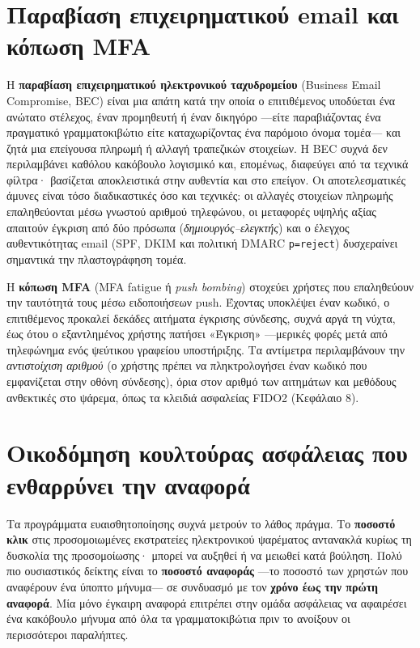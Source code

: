 \documentclass[11pt,openany]{book}
\begin{document}
\section{Παραβίαση επιχειρηματικού email και κόπωση MFA}\label{sec:5.5}
Η \textbf{παραβίαση επιχειρηματικού ηλεκτρονικού ταχυδρομείου} (Business Email Compromise, BEC) είναι μια απάτη κατά την οποία ο επιτιθέμενος υποδύεται ένα ανώτατο στέλεχος, έναν προμηθευτή ή έναν δικηγόρο —είτε παραβιάζοντας ένα πραγματικό γραμματοκιβώτιο είτε καταχωρίζοντας ένα παρόμοιο όνομα τομέα— και ζητά μια επείγουσα πληρωμή ή αλλαγή τραπεζικών στοιχείων. Η BEC συχνά δεν περιλαμβάνει καθόλου κακόβουλο λογισμικό και, επομένως, διαφεύγει από τα τεχνικά φίλτρα· βασίζεται αποκλειστικά στην αυθεντία και στο επείγον. Οι αποτελεσματικές άμυνες είναι τόσο διαδικαστικές όσο και τεχνικές: οι αλλαγές στοιχείων πληρωμής επαληθεύονται μέσω γνωστού αριθμού τηλεφώνου, οι μεταφορές υψηλής αξίας απαιτούν έγκριση από δύο πρόσωπα (\emph{δημιουργός–ελεγκτής}) και ο έλεγχος αυθεντικότητας email (SPF, DKIM και πολιτική DMARC \texttt{p=reject}) δυσχεραίνει σημαντικά την πλαστογράφηση τομέα.

Η \textbf{κόπωση MFA} (MFA fatigue ή \emph{push bombing}) στοχεύει χρήστες που επαληθεύουν την ταυτότητά τους μέσω ειδοποιήσεων push. Έχοντας υποκλέψει έναν κωδικό, ο επιτιθέμενος προκαλεί δεκάδες αιτήματα έγκρισης σύνδεσης, συχνά αργά τη νύχτα, έως ότου ο εξαντλημένος χρήστης πατήσει «Έγκριση» —μερικές φορές μετά από τηλεφώνημα ενός ψεύτικου γραφείου υποστήριξης. Τα αντίμετρα περιλαμβάνουν την \emph{αντιστοίχιση αριθμού} (ο χρήστης πρέπει να πληκτρολογήσει έναν κωδικό που εμφανίζεται στην οθόνη σύνδεσης), όρια στον αριθμό των αιτημάτων και μεθόδους ανθεκτικές στο ψάρεμα, όπως τα κλειδιά ασφαλείας FIDO2 (Κεφάλαιο 8).

\section{Οικοδόμηση κουλτούρας ασφάλειας που ενθαρρύνει την αναφορά}\label{sec:5.6}
Τα προγράμματα ευαισθητοποίησης συχνά μετρούν το λάθος πράγμα. Το \textbf{ποσοστό κλικ} στις προσομοιωμένες εκστρατείες ηλεκτρονικού ψαρέματος αντανακλά κυρίως τη δυσκολία της προσομοίωσης· μπορεί να αυξηθεί ή να μειωθεί κατά βούληση. Πολύ πιο ουσιαστικός δείκτης είναι το \textbf{ποσοστό αναφοράς} —το ποσοστό των χρηστών που αναφέρουν ένα ύποπτο μήνυμα— σε συνδυασμό με τον \textbf{χρόνο έως την πρώτη αναφορά}. Μία μόνο έγκαιρη αναφορά επιτρέπει στην ομάδα ασφάλειας να αφαιρέσει ένα κακόβουλο μήνυμα από όλα τα γραμματοκιβώτια πριν το ανοίξουν οι περισσότεροι παραλήπτες.
\end{document}
